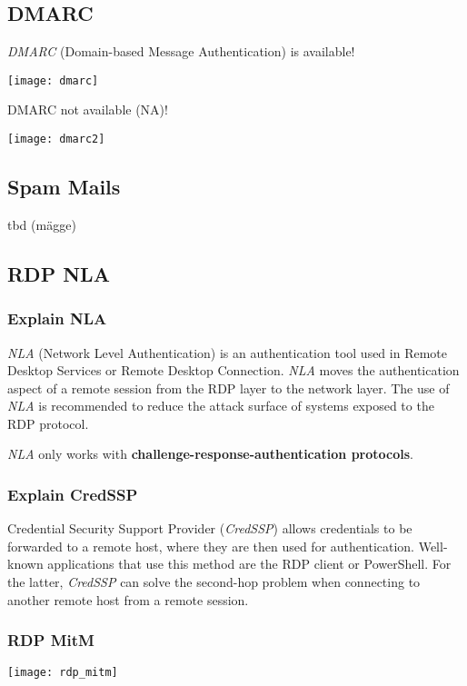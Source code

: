 \subsection{DMARC}
\textit{DMARC} (Domain-based Message Authentication) is available!

\begin{center}
    \texttt{[image: dmarc]}
\end{center}

DMARC not available (NA)!
\begin{center}
    \texttt{[image: dmarc2]}
\end{center}


\subsection{Spam Mails}
tbd (mägge)


\subsection{RDP NLA}

\subsubsection{Explain NLA}
\textit{NLA} (Network Level Authentication) is an authentication tool used in Remote Desktop Services or Remote Desktop Connection.
\textit{NLA} moves the authentication aspect of a remote session from the RDP layer to the network layer. The use of \textit{NLA} is recommended to reduce the attack surface of systems exposed to the RDP protocol.

\textit{NLA} only works with \textbf{challenge-response-authentication protocols}.

\subsubsection{Explain CredSSP}
Credential Security Support Provider (\textit{CredSSP}) allows credentials to be forwarded to a remote host, where they are then used for authentication. Well-known applications that use this method are the RDP client or PowerShell. For the latter, \textit{CredSSP} can solve the second-hop problem when connecting to another remote host from a remote session.

\subsubsection{RDP MitM}
\begin{center}
    \texttt{[image: rdp\_mitm]}
\end{center}

